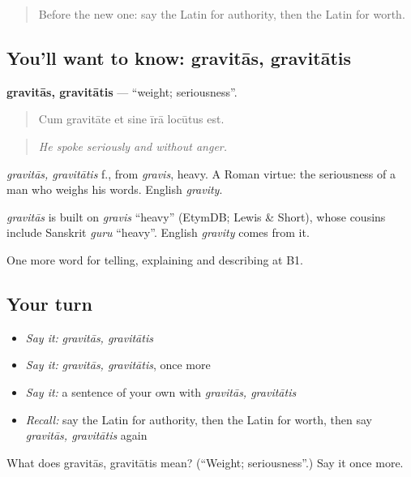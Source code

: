\begin{quote}
Before the new one: say the Latin for authority, then the Latin for worth.
\end{quote}

\subsection*{You'll want to know: gravitās, gravitātis}
\textbf{gravitās, gravitātis} — \textquotedblleft{}weight; seriousness\textquotedblright{}.

\begin{quote}
Cum gravitāte et sine īrā locūtus est.
\end{quote}

\begin{quote}
\emph{He spoke seriously and without anger.}
\end{quote}

\emph{gravitās, gravitātis} f., from \emph{gravis}, heavy. A Roman virtue: the seriousness of a man who weighs his words. English \emph{gravity}.

\begin{cousinweb}
\emph{gravitās} is built on \emph{gravis} \textquotedblleft{}heavy\textquotedblright{} (EtymDB; Lewis \& Short), whose cousins include Sanskrit \emph{guru} \textquotedblleft{}heavy\textquotedblright{}. English \emph{gravity} comes from it.
\end{cousinweb}

\begin{grammarlens}[title={What you've built}]
One more word for telling, explaining and describing at B1.
\end{grammarlens}

\subsection*{Your turn}
\begin{itemize}
\raggedright
  \item \emph{Say it:} \emph{gravitās, gravitātis}
  \item \emph{Say it:} \emph{gravitās, gravitātis}, once more
  \item \emph{Say it:} a sentence of your own with \emph{gravitās, gravitātis}
  \item \emph{Recall:} say the Latin for authority, then the Latin for worth, then say \emph{gravitās, gravitātis} again
\end{itemize}

\begin{tcolorbox}[breakable,colback=teal!4,colframe=teal!35!black,title={Before you move on}]
What does gravitās, gravitātis mean? (\textquotedblleft{}Weight; seriousness\textquotedblright{}.) Say it once more.
\end{tcolorbox}

